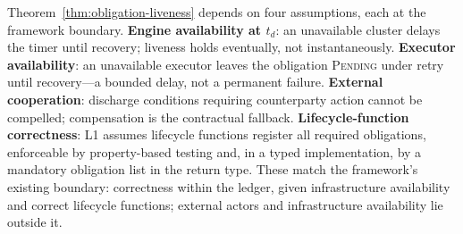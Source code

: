 Theorem~\ref{thm:obligation-liveness} depends on four assumptions, each at the framework boundary. \textbf{Engine availability at $t_d$}: an unavailable cluster delays the timer until recovery; liveness holds eventually, not instantaneously. \textbf{Executor availability}: an unavailable executor leaves the obligation \textsc{Pending} under retry until recovery---a bounded delay, not a permanent failure. \textbf{External cooperation}: discharge conditions requiring counterparty action cannot be compelled; compensation is the contractual fallback. \textbf{Lifecycle-function correctness}: L1 assumes lifecycle functions register all required obligations, enforceable by property-based testing and, in a typed implementation, by a mandatory obligation list in the return type. These match the framework's existing boundary: correctness within the ledger, given infrastructure availability and correct lifecycle functions; external actors and infrastructure availability lie outside it.
